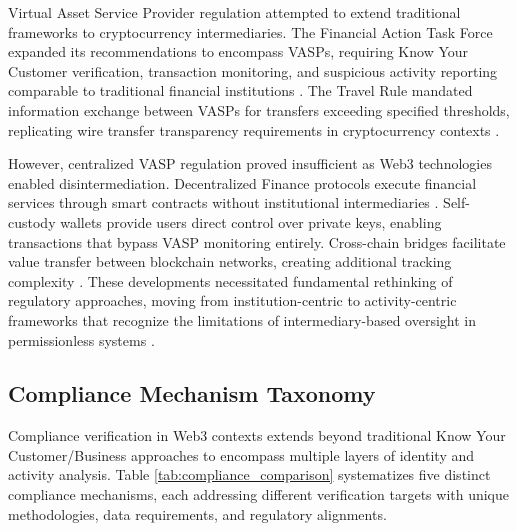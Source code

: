 Virtual Asset Service Provider regulation attempted to extend traditional frameworks to cryptocurrency intermediaries. The Financial Action Task Force expanded its recommendations to encompass VASPs, requiring Know Your Customer verification, transaction monitoring, and suspicious activity reporting comparable to traditional financial institutions \cite{financialactiontaskforcefatf2012internationalstandardscombating,force2021updatedguidanceriskbased}. The Travel Rule mandated information exchange between VASPs for transfers exceeding specified thresholds, replicating wire transfer transparency requirements in cryptocurrency contexts \cite{force2021opportunitieschallengesnew,pocher2022privacytransparencycbdcs}.

However, centralized VASP regulation proved insufficient as Web3 technologies enabled disintermediation. Decentralized Finance protocols execute financial services through smart contracts without institutional intermediaries \cite{harvey2021defifuturefinance,salami2021challengesapproachesregulating}. Self-custody wallets provide users direct control over private keys, enabling transactions that bypass VASP monitoring entirely. Cross-chain bridges facilitate value transfer between blockchain networks, creating additional tracking complexity \cite{zamyatin2021sokcommunicationdistributed,li2025blockchaincrosschainbridge}. These developments necessitated fundamental rethinking of regulatory approaches, moving from institution-centric to activity-centric frameworks that recognize the limitations of intermediary-based oversight in permissionless systems \cite{werbach2018trustverifywhy}.

\subsection{Compliance Mechanism Taxonomy}

Compliance verification in Web3 contexts extends beyond traditional Know Your Customer/Business approaches to encompass multiple layers of identity and activity analysis. Table \ref{tab:compliance_comparison} systematizes five distinct compliance mechanisms, each addressing different verification targets with unique methodologies, data requirements, and regulatory alignments.

